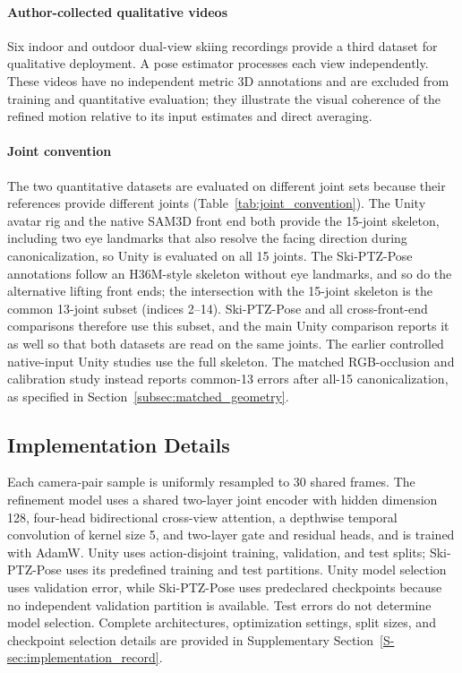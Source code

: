 \documentclass[preprint,12pt]{elsarticle}
\begin{document}
\paragraph{Author-collected qualitative videos}
Six indoor and outdoor dual-view skiing recordings provide a third dataset for qualitative deployment. A pose estimator processes each view independently. These videos have no independent metric 3D annotations and are excluded from training and quantitative evaluation; they illustrate the visual coherence of the refined motion relative to its input estimates and direct averaging.

\paragraph{Joint convention}
The two quantitative datasets are evaluated on different joint sets because their references provide different joints (Table~\ref{tab:joint_convention}). The Unity avatar rig and the native SAM3D front end both provide the 15-joint skeleton, including two eye landmarks that also resolve the facing direction during canonicalization, so Unity is evaluated on all 15 joints. The Ski-PTZ-Pose annotations follow an H36M-style skeleton without eye landmarks, and so do the alternative lifting front ends; the intersection with the 15-joint skeleton is the common 13-joint subset (indices 2--14). Ski-PTZ-Pose and all cross-front-end comparisons therefore use this subset, and the main Unity comparison reports it as well so that both datasets are read on the same joints. The earlier controlled native-input Unity studies use the full skeleton. The matched RGB-occlusion and calibration study instead reports common-13 errors after all-15 canonicalization, as specified in Section~\ref{subsec:matched_geometry}.



\subsection{Implementation Details}
\label{subsec:implementation_details}

Each camera-pair sample is uniformly resampled to 30 shared frames. The refinement model uses a shared two-layer joint encoder with hidden dimension 128, four-head bidirectional cross-view attention, a depthwise temporal convolution of kernel size 5, and two-layer gate and residual heads, and is trained with AdamW. Unity uses action-disjoint training, validation, and test splits; Ski-PTZ-Pose uses its predefined training and test partitions. Unity model selection uses validation error, while Ski-PTZ-Pose uses predeclared checkpoints because no independent validation partition is available. Test errors do not determine model selection. Complete architectures, optimization settings, split sizes, and checkpoint selection details are provided in Supplementary Section~\ref{S-sec:implementation_record}.
\end{document}
